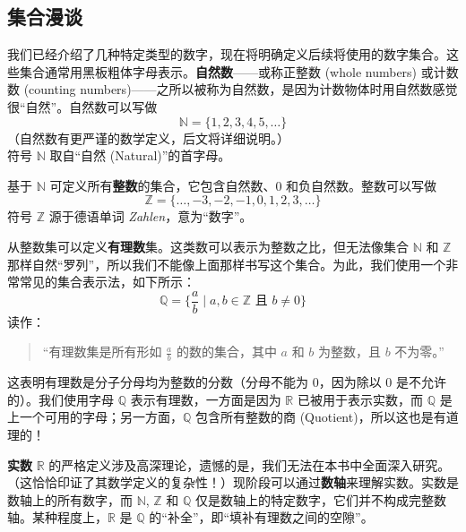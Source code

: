 \subsection{集合漫谈}

我们已经介绍了几种特定类型的数字，现在将明确定义后续将使用的数字集合。这些集合通常用黑板粗体字母表示。\textbf{自然数}——或称正整数 (whole numbers) 或计数数 (counting numbers)——之所以被称为自然数，是因为计数物体时用自然数感觉很``自然''。自然数可以写做
\[\mathbb{N} = \{1, 2, 3, 4, 5, \dots\}\]
（自然数有更严谨的数学定义，后文将详细说明。）\\
符号 $\mathbb{N}$ 取自``自然 (Natural)''的首字母。

基于 $\mathbb{N}$ 可定义所有\textbf{整数}的集合，它包含自然数、$0$ 和负自然数。整数可以写做
\[\mathbb{Z} = \{\dots, -3, -2, -1, 0, 1, 2, 3, \dots\}\]
符号 $\mathbb{Z}$ 源于德语单词 \emph{Zahlen}，意为``数字''。

从整数集可以定义\textbf{有理数}集。这类数可以表示为整数之比，但无法像集合 $\mathbb{N}$ 和 $\mathbb{Z}$ 那样自然``罗列''，所以我们不能像上面那样书写这个集合。为此，我们使用一个非常常见的集合表示法，如下所示：
\[\mathbb{Q} = \Big\{\frac{a}{b} \mid a,b \in \mathbb{Z} \text{ 且 } b \ne 0\Big\}\]
读作：
\begin{quote}
    ``有理数集是所有形如 $\frac{a}{b}$ 的数的集合，其中 $a$ 和 $b$ 为整数，且 $b$ 不为零。''
\end{quote}
这表明有理数是分子分母均为整数的分数（分母不能为 $0$，因为除以 $0$ 是不允许的）。我们使用字母 $\mathbb{Q}$ 表示有理数，一方面是因为 $\mathbb{R}$ 已被用于表示实数，而 $\mathbb{Q}$ 是上一个可用的字母；另一方面，$\mathbb{Q}$ 包含所有整数的商 (Quotient)，所以这也是有道理的！

\textbf{实数} $\mathbb{R}$ 的严格定义涉及高深理论，遗憾的是，我们无法在本书中全面深入研究。（这恰恰印证了其数学定义的复杂性！）现阶段可以通过\textbf{数轴}来理解实数。实数是数轴上的所有数字，而 $\mathbb{N}$, $\mathbb{Z}$ 和 $\mathbb{Q}$ 仅是数轴上的特定数字，它们并不构成完整数轴。某种程度上，$\mathbb{R}$ 是 $\mathbb{Q}$ 的``补全''，即``填补有理数之间的空隙''。
